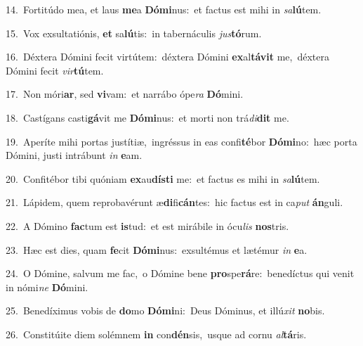 {\numbfont\textcolor{\numbcolor}{14.}}~Fortitúdo mea, et laus \textbf{me}\-a \textbf{Dó}\-\textbf{mi}nus:~\star et factus est mihi in \textit{sa}\-\textbf{lú}tem.\par
{\numbfont\textcolor{\numbcolor}{15.}}~Vox exsultatiónis, \textbf{et} sa\-\textbf{lú}\-tis:~\star in tabernáculis \textit{jus}\-\textbf{tó}rum.\par
{\numbfont\textcolor{\numbcolor}{16.}}~Déxtera Dómini fecit virtútem:~\dagger déxtera Dómini \textbf{ex}\-al\-\textbf{tá}\-\textbf{vit} me,~\star déxtera Dómini fecit \textit{vir}\-\textbf{tú}tem.\par
{\numbfont\textcolor{\numbcolor}{17.}}~Non móri\-\textbf{ar}\-, sed \textbf{vi}\-vam:~\star et narrábo ópe\textit{ra} \textbf{Dó}\-mini.\par
{\numbfont\textcolor{\numbcolor}{18.}}~Castígans casti\-\textbf{gá}\-vit me \textbf{Dó}\-\textbf{mi}nus:~\star et morti non trá\-\textit{di}\-\textbf{dit} me.\par
{\numbfont\textcolor{\numbcolor}{19.}}~Aperíte mihi portas justítiæ,~\dagger ingréssus in eas confi\-\textbf{té}\-bor \textbf{Dó}\-\textbf{mi}no:~\star hæc porta Dómini, justi intrábunt \textit{in} \textbf{e}\-am.\par
{\numbfont\textcolor{\numbcolor}{20.}}~Confitébor tibi quóniam \textbf{ex}\-au\-\textbf{dís}\-\textbf{ti} me:~\star et factus es mihi in \textit{sa}\-\textbf{lú}tem.\par
{\numbfont\textcolor{\numbcolor}{21.}}~Lápidem, quem reprobavérunt æ\-\textbf{di}\-fi\-\textbf{cán}\-tes:~\star hic factus est in ca\textit{put} \textbf{án}\-guli.\par
{\numbfont\textcolor{\numbcolor}{22.}}~A Dómino \textbf{fac}\-tum est \textbf{is}\-tud:~\star et est mirábile in ócu\textit{lis} \textbf{nos}\-tris.\par
{\numbfont\textcolor{\numbcolor}{23.}}~Hæc est dies, quam \textbf{fe}\-cit \textbf{Dó}\-\textbf{mi}nus:~\star exsultémus et lætémur \textit{in} \textbf{e}\-a.\par
{\numbfont\textcolor{\numbcolor}{24.}}~O Dómine, salvum me fac,~\dagger o Dómine bene \textbf{pro}\-spe\-\textbf{rá}\-re:~\star benedíctus qui venit in nómi\textit{ne} \textbf{Dó}\-mini.\par
{\numbfont\textcolor{\numbcolor}{25.}}~Benedíximus vobis de \textbf{do}\-mo \textbf{Dó}\-\textbf{mi}ni:~\star Deus Dóminus, et illú\textit{xit} \textbf{no}\-bis.\par
{\numbfont\textcolor{\numbcolor}{26.}}~Constitúite diem solémnem \textbf{in} con\-\textbf{dén}\-sis,~\star usque ad cornu \textit{al}\-\textbf{tá}ris.\par
